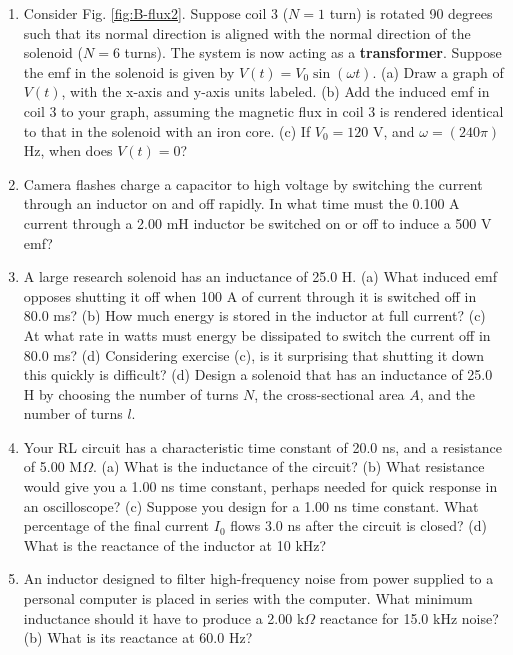 \documentclass[12pt,twocolumn]{article}
\begin{document}
\begin{enumerate}
\item Consider Fig. \ref{fig:B-flux2}.  Suppose coil 3 ($N=1$ turn) is rotated 90 degrees such that its normal direction is aligned with the normal direction of the solenoid ($N=6$ turns).  The system is now acting as a \textbf{transformer}.  Suppose the emf in the solenoid is given by $V(t) = V_0 \sin(\omega t)$. (a) Draw a graph of $V(t)$, with the x-axis and y-axis units labeled.  (b) Add the induced emf in coil 3 to your graph, assuming the magnetic flux in coil 3 is rendered identical to that in the solenoid with an iron core.  (c) If $V_0 = 120$ V, and $\omega = (240\pi)$ Hz, when does $V(t) = 0$? \\ \vspace{4cm}
\item Camera flashes charge a capacitor to high voltage by switching the current through an inductor on and off rapidly. In what time must the 0.100 A current through a 2.00 mH inductor be switched on or off to induce a 500 V emf? \\ \vspace{1cm}
\item A large research solenoid has an inductance of 25.0 H. (a) What induced emf opposes shutting it off when 100 A of current through it is switched off in 80.0 ms? (b) How much energy is stored in the inductor at full current? (c) At what rate in watts must energy be dissipated to switch the current off in 80.0 ms? (d) Considering exercise (c), is it surprising that shutting it down this quickly is difficult? (d) Design a solenoid that has an inductance of 25.0 H by choosing the number of turns $N$, the cross-sectional area $A$, and the number of turns $l$. \\ \vspace{4cm}
\item Your RL circuit has a characteristic time constant of 20.0 ns, and a resistance of 5.00 M$\Omega$. (a) What is the inductance of the circuit? (b) What resistance would give you a 1.00 ns time constant, perhaps needed for quick response in an oscilloscope? (c) Suppose you design for a 1.00 ns time constant.  What percentage of the final current $I_0$ flows 3.0 ns after the circuit is closed? (d) What is the reactance of the inductor at 10 kHz? \\ \vspace{2cm}
\item An inductor designed to filter high-frequency noise from power supplied to a personal computer is placed in series with the computer. What minimum inductance should it have to produce a 2.00 k$\Omega$ reactance for 15.0 kHz noise? (b) What is its reactance at 60.0 Hz? \\ \vspace{1.5cm}

\end{enumerate}
\end{document}
